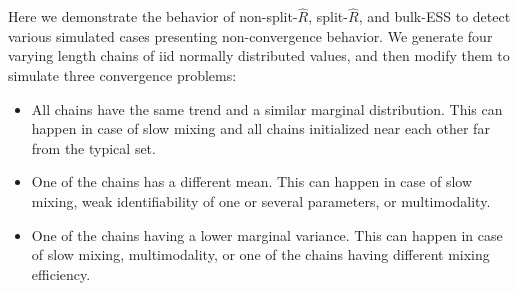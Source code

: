 \documentclass[american,]{article}
\providecommand{\tightlist}{%
  \setlength{\itemsep}{0pt}\setlength{\parskip}{0pt}}
\theoremstyle{definition}
\begin{document}
Here we demonstrate the behavior of non-split-\(\widehat{R}\),
split-\(\widehat{R}\), and bulk-ESS to detect various simulated cases
presenting non-convergence behavior. We generate four varying length
chains of iid normally distributed values, and then modify them to
simulate three convergence problems:
\begin{itemize}
\tightlist
\item All chains have the same trend and a similar marginal
  distribution. This can happen in case of slow mixing and all chains
  initialized near each other far from the typical set.
\item One of the chains has a different mean. This can happen in case
  of slow mixing, weak identifiability of one or several parameters, or
  multimodality.
\item One of the chains having a lower marginal variance. This can
  happen in case of slow mixing, multimodality, or one of the chains
  having different mixing efficiency.
\end{itemize}
\end{document}
